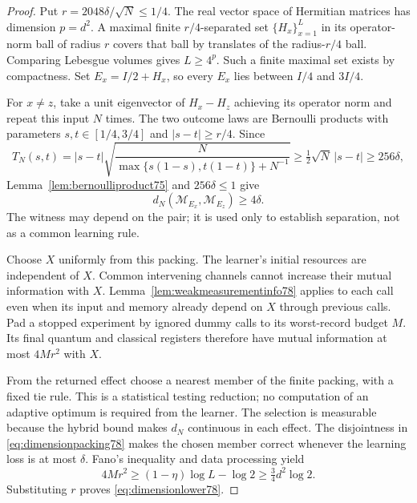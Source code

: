 \begin{proof}
Put $r=2048\delta/\sqrt N\le1/4$.  The real vector space of
Hermitian matrices has dimension $p=d^2$.  A maximal finite
$r/4$-separated set $\{H_x\}_{x=1}^L$ in its operator-norm ball
of radius $r$ covers that ball by translates of the radius-$r/4$
ball.  Comparing Lebesgue volumes gives $L\ge4^p$.
Such a finite maximal set exists by compactness.  Set
$E_x=I/2+H_x$, so every $E_x$ lies between $I/4$ and $3I/4$.

For $x\ne z$, take a unit eigenvector of $H_x-H_z$ achieving
its operator norm and repeat this input $N$ times.  The two outcome
laws are Bernoulli products with parameters $s,t\in[1/4,3/4]$
and $|s-t|\ge r/4$.  Since
\[
 T_N(s,t)
 =|s-t|\sqrt{\frac{N}{\max\{s(1-s),t(1-t)\}+N^{-1}}}
 \ge\tfrac12\sqrt N\,|s-t|\ge256\delta,
\]
Lemma~\ref{lem:bernoulliproduct75} and $256\delta\le1$ give
\begin{equation}\label{eq:dimensionpacking78}
 d_N(\mathcal M_{E_x},\mathcal M_{E_z})\ge4\delta.
\end{equation}
The witness may depend on the pair; it is used only to establish
separation, not as a common learning rule.

Choose $X$ uniformly from this packing.  The learner's initial
resources are independent of $X$.  Common intervening channels
cannot increase their mutual information with $X$.
Lemma~\ref{lem:weakmeasurementinfo78} applies to each call even
when its input and memory already depend on $X$ through previous
calls.  Pad a stopped experiment by ignored dummy calls to its
worst-record budget $M$.  Its final quantum and classical registers
therefore have mutual information at most $4Mr^2$ with $X$.

From the returned effect choose a nearest member of the finite
packing, with a fixed tie rule.  This is a statistical testing
reduction; no computation of an adaptive optimum is required from
the learner.  The selection is measurable because the hybrid bound
makes $d_N$ continuous in each effect.  The disjointness in \eqref{eq:dimensionpacking78}
makes the chosen member correct whenever the learning loss is at
most $\delta$.  Fano's inequality and data processing yield
\[
 4Mr^2\ge(1-\eta)\log L-\log2
 \ge\tfrac34 d^2\log2.
\]
Substituting $r$ proves \eqref{eq:dimensionlower78}.
\end{proof}

